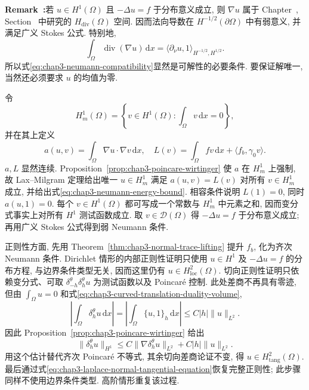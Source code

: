 \par\noindent{}\textbf{Remark~\thechapterthreesectionfourremark:}\label{rem:chap3-weak-neumann-normal-trace}\quad 若 $u\in H^1(\Omega)$ 且 $-\Delta u=f$ 于分布意义成立, 则 $\nabla u$ 属于 Chapter~, Section~ 中研究的 $H_{\mathrm{div}}(\Omega)$ 空间. 因而法向导数在 $H^{-1/2}(\partial\Omega)$ 中有弱意义, 并满足广义 Stokes 公式. 特别地,
\[
 \int_\Omega\operatorname{div}(\nabla u)\,\mathrm dx
 =\langle\partial_\nu u,1\rangle_{H^{-1/2},H^{1/2}}.
\]
所以式\eqref{eq:chap3-neumann-compatibility}显然是可解性的必要条件. 要保证解唯一, 当然还必须要求 $u$ 的均值为零.

\begin{Proof}
令
\[
 H_m^1(\Omega)=\left\{v\in H^1(\Omega):\int_\Omega v\,\mathrm dx=0\right\},
\]
并在其上定义
\[
 a(u,v)=\int_\Omega\nabla u\cdot\nabla v\,\mathrm dx,
 \quad L(v)=\int_\Omega fv\,\mathrm dx+\langle f_b,\gamma_0v\rangle.
\]
$a,L$ 显然连续. Proposition~\ref{prop:chap3-poincare-wirtinger} 使 $a$ 在 $H_m^1$ 上强制, 故 Lax--Milgram 定理给出唯一 $u\in H_m^1$ 满足 $a(u,v)=L(v)$ 对所有 $v\in H_m^1$ 成立, 并给出式\eqref{eq:chap3-neumann-energy-bound}. 相容条件说明 $L(1)=0$, 同时 $a(u,1)=0$. 每个 $v\in H^1(\Omega)$ 都可写成一个常数与 $H_m^1$ 中元素之和, 因而变分式事实上对所有 $H^1$ 测试函数成立. 取 $v\in\mathcal D(\Omega)$ 得 $-\Delta u=f$ 于分布意义成立; 再用广义 Stokes 公式得到弱 Neumann 条件.

正则性方面, 先用 Theorem~\ref{thm:chap3-normal-trace-lifting} 提升 $f_b$, 化为齐次 Neumann 条件. Dirichlet 情形的内部正则性证明只使用 $u\in H^1$ 及 $-\Delta u=f$ 的分布方程, 与边界条件类型无关, 因而这里仍有 $u\in H^2_{\mathrm{loc}}(\Omega)$. 切向正则性证明只依赖变分式、可取 $\delta_{-h}^\theta\delta_h^\theta u$ 为测试函数以及 Poincar\'e 控制. 此处差商不再具有零迹, 但由 $\int_\Omega u=0$ 和式\eqref{eq:chap3-curved-translation-duality-volume},
\[
 \left|\int_\Omega\delta_h^\theta u\,\mathrm dx\right|
 =\left|\int_\Omega\{u,1\}_h\,\mathrm dx\right|
 \leq C|h|\|u\|_{L^2}.
\]
因此 Proposition~\ref{prop:chap3-poincare-wirtinger} 给出
\[
 \|\delta_h^\theta u\|_{H^1}
 \leq C\|\nabla\delta_h^\theta u\|_{L^2}+C|h|\|u\|_{L^2}.
\]
用这个估计替代齐次 Poincar\'e 不等式, 其余切向差商论证不变, 得 $u\in H_{\mathrm{tang}}^2(\Omega)$. 最后通过式\eqref{eq:chap3-laplace-normal-tangential-equation}恢复完整正则性; 此步骤同样不使用边界条件类型. 高阶情形重复该过程.
\end{Proof}
